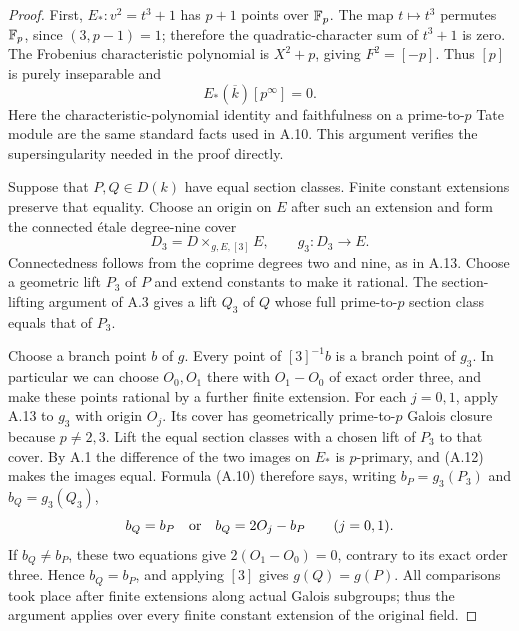\begin{proof}
First, $E_*:v^2=t^3+1$ has $p+1$ points over $\mathbb F_p$.
The map $t\mapsto t^3$ permutes $\mathbb F_p$, since $(3,p-1)=1$;
therefore the quadratic-character sum of $t^3+1$ is zero.
The Frobenius characteristic polynomial is $X^2+p$, giving
$F^2=[-p]$. Thus $[p]$ is purely inseparable and
\[
 E_*(\overline k)[p^\infty]=0.                                  \tag{A.12}
\]
Here the characteristic-polynomial identity and faithfulness
on a prime-to-$p$ Tate module are the same standard facts
used in A.10. This argument verifies the supersingularity
needed in the proof directly.

Suppose that $P,Q\in D(k)$ have equal section classes.
Finite constant extensions preserve that equality. Choose
an origin on $E$ after such an extension and form the
connected \'etale degree-nine cover
\[
 D_3=D\times_{g,E,[3]}E,
 \qquad g_3:D_3\to E.
\]
Connectedness follows from the coprime degrees two and nine,
as in A.13. Choose a geometric lift $P_3$ of $P$ and extend
constants to make it rational. The section-lifting argument
of A.3 gives a lift $Q_3$ of $Q$ whose full prime-to-$p$
section class equals that of $P_3$.

Choose a branch point $b$ of $g$. Every point of $[3]^{-1}b$
is a branch point of $g_3$. In particular we can choose
$O_0,O_1$ there with $O_1-O_0$ of exact order three, and
make these points rational by a further finite extension.
For each $j=0,1$, apply A.13 to $g_3$ with origin $O_j$.
Its cover has geometrically prime-to-$p$ Galois closure
because $p\ne2,3$. Lift the equal section classes with a
chosen lift of $P_3$ to that cover. By A.1 the difference
of the two images on $E_*$ is $p$-primary, and (A.12) makes
the images equal. Formula (A.10) therefore says, writing
$b_P=g_3(P_3)$ and $b_Q=g_3(Q_3)$,
\[
 b_Q=b_P\quad\hbox{or}\quad b_Q=2O_j-b_P
 \qquad(j=0,1).
\]
If $b_Q\ne b_P$, these two equations give
$2(O_1-O_0)=0$, contrary to its exact order three.
Hence $b_Q=b_P$, and applying $[3]$ gives $g(Q)=g(P)$.
All comparisons took place after finite extensions along
actual Galois subgroups; thus the argument applies over
every finite constant extension of the original field.
\end{proof}

